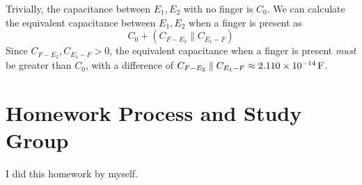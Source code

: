 \documentclass[]{article}
\begin{document}
Trivially, the capacitance between \(E_1, E_2\) with no finger is \(C_0\). 
We can calculate the equivalent capacitance between \(E_1, E_2\) when a finger is present as 
\begin{equation}
	C_0 + (C_{F - E_2} \parallel C_{E_1 - F})
\end{equation}
Since \(C_{F - E_2}, C_{E_1 - F} > 0\), the equivalent capacitance when a finger is present \emph{must} be greater than \(C_0\), with a difference of \(C_{F - E_2} \parallel C_{E_1 - F} \approx \SI{2.110d-14}{\farad}\). 

\section{Homework Process and Study Group}

I did this homework by myself. 

\newpage

%
\end{document}
